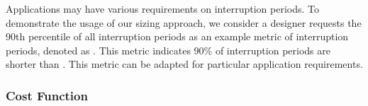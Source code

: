 Applications may have various requirements on interruption periods. 
To demonstrate the usage of our sizing approach, we consider a designer requests the 90th percentile of all interruption periods as an example metric of interruption periods, denoted as . 
This metric indicates 90\% of interruption periods are shorter than . 
This metric can be adapted for particular application requirements. 

\subsubsection{Cost Function}

